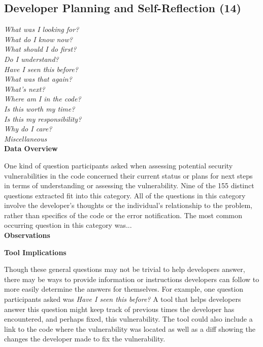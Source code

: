 \documentclass[conference]{IEEEtran}
\begin{document}

\noindent\subsection{\textbf{Developer Planning and Self-Reflection (14)}} \label{dpr}

\noindent\emph{What was I looking for?} \\
\emph{What do I know now?} \\
\emph{What should I do first?} \\
\emph{Do I understand?} \\
\emph{Have I seen this before?} \\
\emph{What was that again?} \\
\emph{What's next?} \\
\emph{Where am I in the code?} \\
\emph{Is this worth my time?} \\
\emph{Is this my responsibility?} \\
\emph{Why do I care?} \\
\emph{Miscellaneous} \\

\noindent\textbf{Data Overview}

One kind of question participants asked when assessing potential security vulnerabilities in the code concerned their current status or plans for next steps in terms of understanding or assessing the vulnerability. Nine of the 155 distinct questions extracted fit into this category. All of the questions in this category involve the developer's thoughts or the individual's relationship to the problem, rather than specifics of the code or the error notification.  The most common occurring question in this category was...
\\

\noindent\textbf{Observations}



\noindent\textbf{Tool Implications}

Though these general questions may not be trivial to help developers answer, there may be ways to provide information or instructions developers can follow to more easily determine the answers for themselves. 
For example, one question participants asked was \textit{Have I seen this before?}
A tool that helps developers answer this question might keep track of previous times the developer has encountered, and perhaps fixed, this vulnerability. 
The tool could also include a link to the code where the vulnerability was located as well as a diff showing the changes the developer made to fix the vulnerability.
\end{document}
